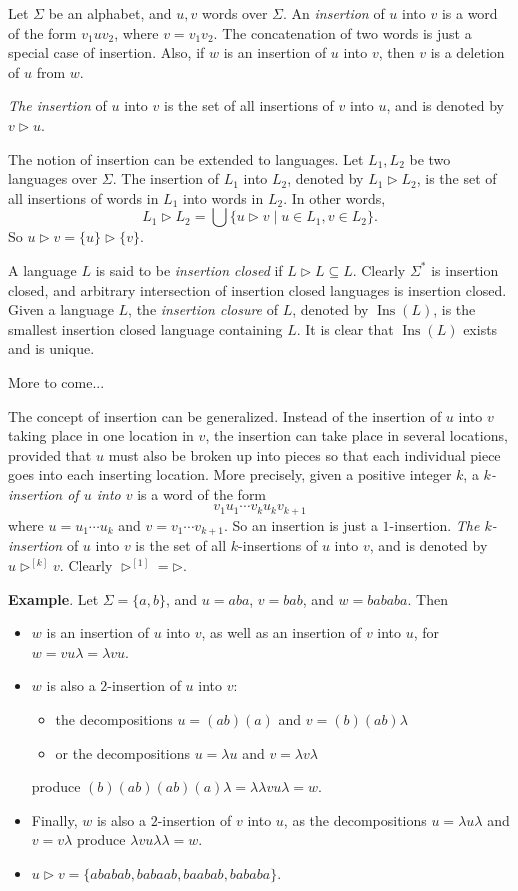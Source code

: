 \documentclass[12pt]{article}
\begin{document}
Let $\Sigma$ be an alphabet, and $u,v$ words over $\Sigma$.  An \emph{insertion} of $u$ into $v$ is a word of the form $v_1uv_2$, where $v=v_1v_2$.  The concatenation of two words is just a special case of insertion.  Also, if $w$ is an insertion of $u$ into $v$, then $v$ is a deletion of $u$ from $w$.

\emph{The insertion} of $u$ into $v$ is the set of all insertions of $v$ into $u$, and is denoted by $v\rhd u$.

The notion of insertion can be extended to languages.  Let $L_1,L_2$ be two languages over $\Sigma$.  The insertion of $L_1$ into $L_2$, denoted by $L_1 \rhd L_2$, is the set of all insertions of words in $L_1$ into words in $L_2$.  In other words, $$L_1 \rhd L_2 = \bigcup \lbrace u\rhd v\mid u\in L_1, v\in L_2 \rbrace.$$  So $u \rhd v = \lbrace u\rbrace \rhd \lbrace v\rbrace$.

A language $L$ is said to be \emph{insertion closed} if $L\rhd L \subseteq L$.  Clearly $\Sigma^*$ is insertion closed, and arbitrary intersection of insertion closed languages is insertion closed.  Given a language $L$, the \emph{insertion closure} of $L$, denoted by $\operatorname{Ins}(L)$, is the smallest insertion closed language containing $L$.  It is clear that $\operatorname{Ins}(L)$ exists and is unique.

More to come...

The concept of insertion can be generalized.  Instead of the insertion of $u$ into $v$ taking place in one location in $v$, the insertion can take place in several locations, provided that $u$ must also be broken up into pieces so that each individual piece goes into each inserting location.  More precisely, given a positive integer $k$, a \emph{$k$-insertion of $u$ into $v$} is a word of the form $$v_1 u_1 \cdots v_k u_k v_{k+1}$$ where $u=u_1 \cdots u_k$ and $v=v_1 \cdots v_{k+1}$.  So an insertion is just a $1$-insertion.  \emph{The $k$-insertion} of $u$ into $v$ is the set of all $k$-insertions of $u$ into $v$, and is denoted by $u \rhd^{[k]} v$.  Clearly $\rhd^{[1]} = \rhd$.

\textbf{Example}.  Let $\Sigma=\lbrace a,b\rbrace$, and $u=aba$, $v=bab$, and $w=bababa$.  Then 
\begin{itemize}
\item $w$ is an insertion of $u$ into $v$, as well as an insertion of $v$ into $u$, for $w=vu\lambda = \lambda v u$.
\item $w$ is also a $2$-insertion of $u$ into $v$: 
\begin{itemize}
\item
the decompositions $u=(ab)(a)$ and $v=(b)(ab)\lambda$
\item
or the decompositions  $u=\lambda u$ and $v=\lambda v\lambda$
\end{itemize}
produce $(b)(ab)(ab)(a)\lambda = \lambda \lambda v u \lambda = w$.
\item Finally, $w$ is also a $2$-insertion of $v$ into $u$, as the decompositions $u = \lambda u \lambda$ and $v= v \lambda$ produce $\lambda v u\lambda  \lambda = w$.
\item $u\rhd v=\lbrace ababab, babaab, baabab, bababa\rbrace$.
\end{itemize}
\end{document}
